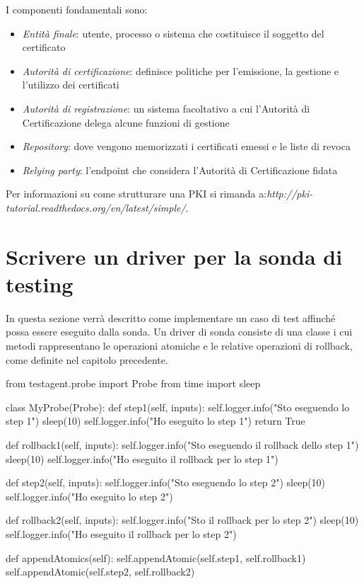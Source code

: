 \documentclass[../main.tex]{subfiles}
\begin{document}
I componenti fondamentali sono:
\begin{itemize}
\item \textit{Entità finale}: utente, processo o sistema che costituisce il soggetto del certificato
\item \textit{Autorità di certificazione}: definisce politiche per l'emissione, la gestione e l'utilizzo dei certificati
\item \textit{Autorità di registrazione}: un sistema facoltativo a cui l'Autorità di Certificazione delega alcune funzioni di gestione
\item \textit{Repository}: dove vengono memorizzati i certificati emessi e le liste di revoca
\item \textit{Relying party}: l'endpoint che considera l'Autorità di Certificazione fidata
\end{itemize}

Per informazioni su come strutturare una PKI si rimanda a:\newline \textit{http://pki-tutorial.readthedocs.org/en/latest/simple/}.

\section {Scrivere un driver per la sonda di testing}
In questa sezione verrà descritto come implementare un caso di test affinché possa essere eseguito dalla sonda.
Un driver di sonda consiste di una classe i cui metodi rappresentano le operazioni atomiche e le relative operazioni di rollback, come definite nel capitolo precedente.
\begin{python}

from testagent.probe import Probe
from time import sleep

class MyProbe(Probe):
    def step1(self, inputs):
        self.logger.info("Sto eseguendo lo step 1")
        sleep(10)
        self.logger.info("Ho eseguito lo step 1")
        return True

    def rollback1(self, inputs):
        self.logger.info("Sto eseguendo il rollback dello step 1")
        sleep(10)
        self.logger.info("Ho eseguito il rollback per lo step 1")

    def step2(self, inputs):
        self.logger.info("Sto eseguendo lo step 2")
        sleep(10)
        self.logger.info("Ho eseguito lo step 2")
        
    def rollback2(self, inputs):
        self.logger.info("Sto il rollback per lo step 2")
        sleep(10)        
        self.logger.info("Ho eseguito il rollback per lo step 2")

    def appendAtomics(self):
        self.appendAtomic(self.step1, self.rollback1)
        self.appendAtomic(self.step2, self.rollback2)
        
\end{python}
\end{document}

